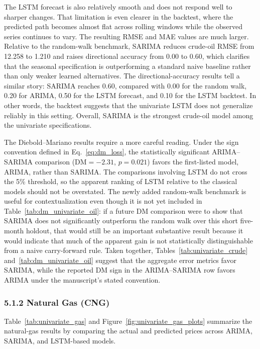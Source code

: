 \documentclass[pdflatex,sn-mathphys-num]{sn-jnl}%
\theoremstyle{thmstyleone}%
\theoremstyle{thmstyletwo}%
\theoremstyle{thmstylethree}%
\begin{document}
The LSTM forecast is also relatively smooth and does not respond well to sharper changes. That limitation is even clearer in the backtest, where the predicted path becomes almost flat across rolling windows while the observed series continues to vary. The resulting RMSE and MAE values are much larger. Relative to the random-walk benchmark, SARIMA reduces crude-oil RMSE from 12.258 to 1.210 and raises directional accuracy from 0.00 to 0.60, which clarifies that the seasonal specification is outperforming a standard naive baseline rather than only weaker learned alternatives. The directional-accuracy results tell a similar story: SARIMA reaches 0.60, compared with 0.00 for the random walk, 0.20 for ARIMA, 0.50 for the LSTM forecast, and 0.10 for the LSTM backtest. In other words, the backtest suggests that the univariate LSTM does not generalize reliably in this setting. Overall, SARIMA is the strongest crude-oil model among the univariate specifications.

The Diebold--Mariano results require a more careful reading. Under the sign convention defined in Eq.~\ref{eq:dm_loss}, the statistically significant ARIMA--SARIMA comparison ($\mathrm{DM}=-2.31$, $p=0.021$) favors the first-listed model, ARIMA, rather than SARIMA. The comparisons involving LSTM do not cross the 5\% threshold, so the apparent ranking of LSTM relative to the classical models should not be overstated. The newly added random-walk benchmark is useful for contextualization even though it is not yet included in Table~\ref{tab:dm_univariate_oil}: if a future DM comparison were to show that SARIMA does not significantly outperform the random walk over this short five-month holdout, that would still be an important substantive result because it would indicate that much of the apparent gain is not statistically distinguishable from a naive carry-forward rule. Taken together, Tables~\ref{tab:univariate_crude} and~\ref{tab:dm_univariate_oil} suggest that the aggregate error metrics favor SARIMA, while the reported DM sign in the ARIMA--SARIMA row favors ARIMA under the manuscript's stated convention.

\subsubsection*{5.1.2 Natural Gas (CNG)}\label{subsubsec:cngresults}

Table~\ref{tab:univariate_gas} and Figure~\ref{fig:univariate_gas_plots} summarize the natural-gas results by comparing the actual and predicted prices across ARIMA, SARIMA, and LSTM-based models.
\end{document}
